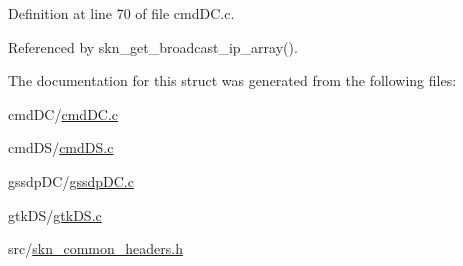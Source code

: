 Definition at line 70 of file cmd\+D\+C.\+c.



Referenced by skn\+\_\+get\+\_\+broadcast\+\_\+ip\+\_\+array().



The documentation for this struct was generated from the following files\+:\begin{DoxyCompactItemize}
\item 
cmd\+D\+C/\hyperlink{cmd_d_c_8c}{cmd\+D\+C.\+c}\item 
cmd\+D\+S/\hyperlink{cmd_d_s_8c}{cmd\+D\+S.\+c}\item 
gssdp\+D\+C/\hyperlink{gssdp_d_c_8c}{gssdp\+D\+C.\+c}\item 
gtk\+D\+S/\hyperlink{gtk_d_s_8c}{gtk\+D\+S.\+c}\item 
src/\hyperlink{skn__common__headers_8h}{skn\+\_\+common\+\_\+headers.\+h}\end{DoxyCompactItemize}
